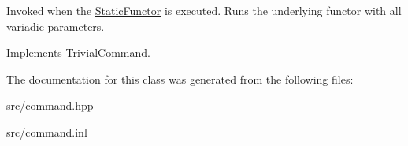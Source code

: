 Invoked when the \mbox{\hyperlink{class_static_functor}{Static\+Functor}} is executed. Runs the underlying functor with all variadic parameters. 

Implements \mbox{\hyperlink{class_trivial_command_aa61a3e5fd78d3a2dec6fcf6dcb2e5189}{Trivial\+Command}}.



The documentation for this class was generated from the following files\+:\begin{DoxyCompactItemize}
\item 
src/command.\+hpp\item 
src/command.\+inl\end{DoxyCompactItemize}
